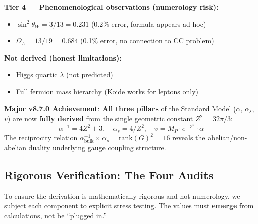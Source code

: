 \documentclass[12pt,a4paper]{article}
\newcommand{\Zsq}{Z^2}
\begin{document}
\begin{tcolorbox}[colback=red!5!white, colframe=red!60!black, title=Epistemic Classification of All Claims (v8.7.0)]
\textbf{Tier 4 --- Phenomenological observations (numerology risk):}
\begin{itemize}[itemsep=0pt]
    \item $\sin^2\theta_W = 3/13 = 0.231$ (0.2\% error, formula appears ad hoc)
    \item $\Omega_\Lambda = 13/19 = 0.684$ (0.1\% error, no connection to CC problem)
\end{itemize}

\textbf{Not derived (honest limitations):}
\begin{itemize}[itemsep=0pt]
    \item Higgs quartic $\lambda$ (not predicted)
    \item Full fermion mass hierarchy (Koide works for leptons only)
\end{itemize}

\textbf{Major v8.7.0 Achievement}: \textbf{All three pillars} of the Standard Model ($\alpha$, $\alpha_s$, $v$) are now \textbf{fully derived} from the single geometric constant $\Zsq = 32\pi/3$:
\begin{equation}
\boxed{
\alpha^{-1} = 4\Zsq + 3, \quad \alpha_s = 4/\Zsq, \quad v = M_P \cdot e^{-\Zsq} \cdot \alpha
}
\end{equation}
The reciprocity relation $\alpha^{-1}_{\text{bulk}} \times \alpha_s = \text{rank}(G)^2 = 16$ reveals the abelian/non-abelian duality underlying gauge coupling structure.
\end{tcolorbox}

\subsection{Rigorous Verification: The Four Audits}

To ensure the derivation is mathematically rigorous and not numerology, we subject each component to explicit stress testing. The values must \textbf{emerge} from calculations, not be ``plugged in.''
\end{document}
